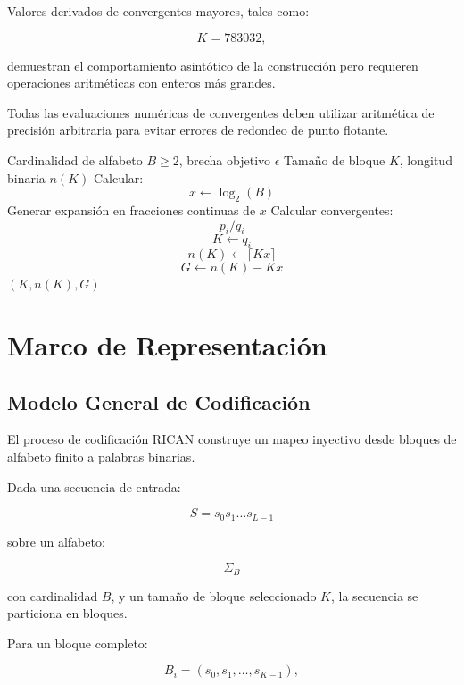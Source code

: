 \documentclass[onecolumn]{IEEEtran}
\begin{document}
Valores derivados de convergentes mayores, tales como:

\[
K=783032,
\]

demuestran el comportamiento asintótico de la construcción pero
requieren operaciones aritméticas con enteros más grandes.

Todas las evaluaciones numéricas de convergentes deben utilizar
aritmética de precisión arbitraria para evitar errores de redondeo
de punto flotante.

\begin{algorithm}[!t]
\caption{Selección de Bloque RICAN Usando Fracciones Continuas}
\label{alg:block}
\begin{algorithmic}[1]
\REQUIRE Cardinalidad de alfabeto $B\geq2$, brecha objetivo $\epsilon$
\ENSURE Tamaño de bloque $K$, longitud binaria $n(K)$
\STATE Calcular:
\[
x\leftarrow\log_2(B)
\]
\STATE Generar expansión en fracciones continuas de $x$
\STATE Calcular convergentes:
\[
p_i/q_i
\]
\STATE
\[
K\leftarrow q_i
\]
\STATE
\[
n(K)\leftarrow\lceil Kx\rceil
\]
\STATE
\[
G\leftarrow n(K)-Kx
\]
\RETURN $(K,n(K),G)$
\ENDIF
\ENDFOR
\end{algorithmic}
\end{algorithm}


\section{Marco de Representación}

\subsection{Modelo General de Codificación}

El proceso de codificación RICAN construye un mapeo inyectivo desde
bloques de alfabeto finito a palabras binarias.

Dada una secuencia de entrada:

\[
S=s_0s_1\ldots s_{L-1}
\]

sobre un alfabeto:

\[
\Sigma_B
\]

con cardinalidad $B$, y un tamaño de bloque seleccionado $K$, la
secuencia se particiona en bloques.

Para un bloque completo:

\[
B_i=(s_0,s_1,\ldots,s_{K-1}),
\]
\end{document}
